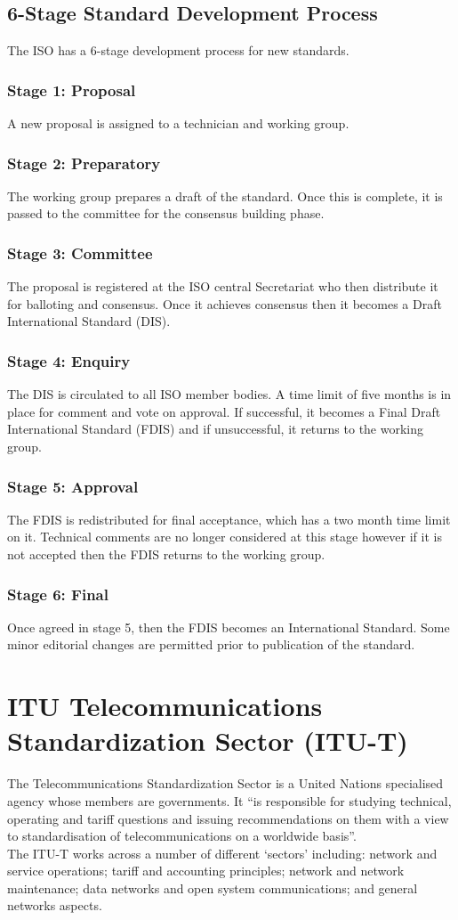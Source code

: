 \subsection{6-Stage Standard Development Process}
The ISO has a 6-stage development process for new standards.
\subsubsection{Stage 1: Proposal}
A new proposal is assigned to a technician and working group.
\subsubsection{Stage 2: Preparatory}
The working group prepares a draft of the standard. Once this is complete, it is passed to the committee for the consensus building phase. 
\subsubsection{Stage 3: Committee}
The proposal is registered at the ISO central Secretariat who then distribute it for balloting and consensus. Once it achieves consensus then it becomes a Draft International Standard (DIS). 
\subsubsection{Stage 4: Enquiry}
The DIS is circulated to all ISO member bodies. A time limit of five months is in place for comment and vote on approval. If successful, it becomes a Final Draft International Standard (FDIS) and if unsuccessful, it returns to the working group.
\subsubsection{Stage 5: Approval}
The FDIS is redistributed for final acceptance, which has a two month time limit on it. Technical comments are no longer considered at this stage however if it is not accepted then the FDIS returns to the working group.
\subsubsection{Stage 6: Final}
Once agreed in stage 5, then the FDIS becomes an International Standard. Some minor editorial changes are permitted prior to publication of the standard.

\section{ITU Telecommunications Standardization Sector (ITU-T)}
The Telecommunications Standardization Sector is a United Nations specialised agency whose members are governments. It ``is responsible for studying technical, operating and tariff questions and issuing recommendations on them with a view to standardisation of telecommunications on a worldwide basis''.\\
The ITU-T works across a number of different `sectors' including: network and service operations; tariff and accounting principles; network and network maintenance; data networks and open system communications; and general networks aspects.
